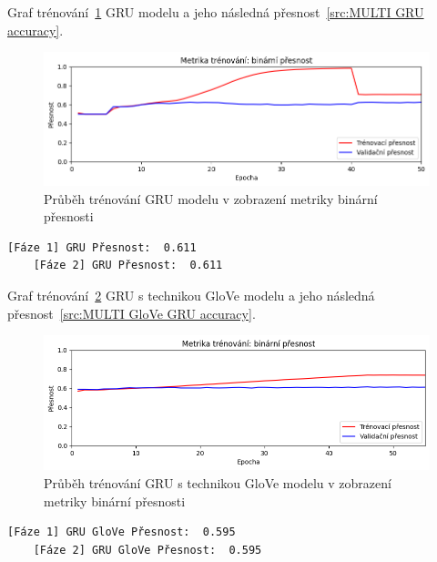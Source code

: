 Graf trénování~\ref{fig:MULTI GRU model train} GRU modelu a jeho následná přesnost~\ref{src:MULTI GRU accuracy}.
\begin{figure}[H]
	\centering
	\includegraphics[width=1\textwidth]{Figures/MULTI_GRU_binarni_presnost.png}
	\caption{Průběh trénování GRU modelu v zobrazení metriky binární přesnosti}\label{fig:MULTI GRU model train}
\end{figure}
\begin{lstlisting}[label=src:MULTI GRU accuracy, caption={Výsledek GRU modelu na více jazyčném datasetu po trénování~\ref{fig:MULTI GRU model train}}]
	[Fáze 1] GRU Přesnost:  0.611
	[Fáze 2] GRU Přesnost:  0.611
\end{lstlisting}

Graf trénování~\ref{fig:MULTI GloVe GRU model train} GRU s technikou GloVe modelu a jeho následná přesnost~\ref{src:MULTI GloVe GRU accuracy}.
\begin{figure}[H]
	\centering
	\includegraphics[width=1\textwidth]{Figures/MULTI_GRU_GLOVE_binarni_presnost.png}
	\caption{Průběh trénování GRU s technikou GloVe modelu v zobrazení metriky binární přesnosti}\label{fig:MULTI GloVe GRU model train}
\end{figure}
\begin{lstlisting}[label=src:MULTI GloVe GRU accuracy, caption={Výsledek GRU s technikou GloVe modelu na více jazyčném datasetu po trénování~\ref{fig:MULTI GloVe GRU model train}}]
	[Fáze 1] GRU GloVe Přesnost:  0.595
	[Fáze 2] GRU GloVe Přesnost:  0.595
\end{lstlisting}

